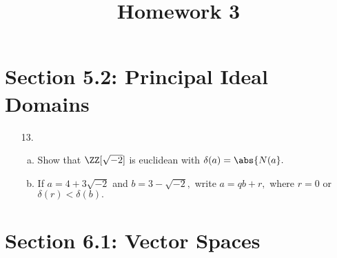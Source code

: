 \documentclass{article}
\begin{document}
\title{Homework 3}
\maketitle
\thispagestyle{fancy}

\section*{Section 5.2: Principal Ideal Domains}

\begin{itemize}
	\item[13.] \begin{enumerate}[(a)]
			\item Show that $\ZZ[\sqrt{-2}]$ is euclidean with $\delta(a)=\abs{N(a}.$

			\item If $a=4+3\sqrt{-2}$ and $b=3-\sqrt{-2},$ write $a=qb+r,$ where $r=0$ or $\delta(r)<\delta(b).$
				
		\end{enumerate}
		
\end{itemize}

\section*{Section 6.1: Vector Spaces}
\end{document}
